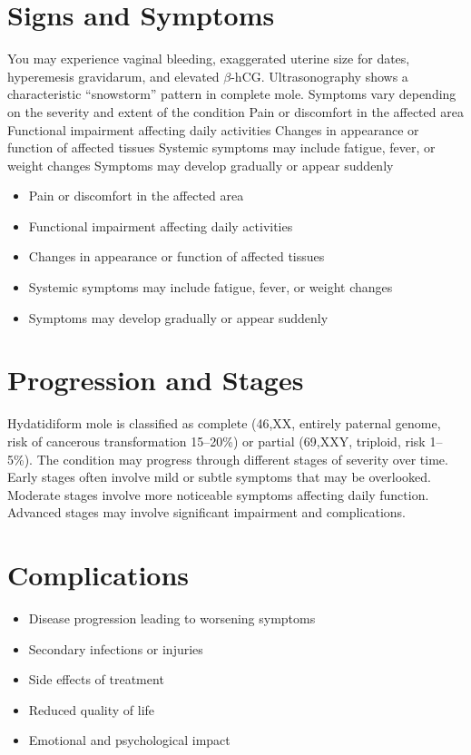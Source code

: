 \section{Signs and Symptoms}
You may experience vaginal bleeding, exaggerated uterine size for dates, hyperemesis gravidarum, and elevated $\beta$-hCG. Ultrasonography shows a characteristic ``snowstorm'' pattern in complete mole. Symptoms vary depending on the severity and extent of the condition Pain or discomfort in the affected area Functional impairment affecting daily activities Changes in appearance or function of affected tissues Systemic symptoms may include fatigue, fever, or weight changes Symptoms may develop gradually or appear suddenly

\begin{itemize}[noitemsep]
  \item Pain or discomfort in the affected area
  \item Functional impairment affecting daily activities
  \item Changes in appearance or function of affected tissues
  \item Systemic symptoms may include fatigue, fever, or weight changes
  \item Symptoms may develop gradually or appear suddenly
\end{itemize}
\section{Progression and Stages}
Hydatidiform mole is classified as complete (46,XX, entirely paternal genome, risk of cancerous transformation 15--20\%) or partial (69,XXY, triploid, risk 1--5\%). The condition may progress through different stages of severity over time. Early stages often involve mild or subtle symptoms that may be overlooked. Moderate stages involve more noticeable symptoms affecting daily function. Advanced stages may involve significant impairment and complications.
\section{Complications}
\begin{itemize}[noitemsep]
  \item Disease progression leading to worsening symptoms
  \item Secondary infections or injuries
  \item Side effects of treatment
  \item Reduced quality of life
  \item Emotional and psychological impact
\end{itemize}
